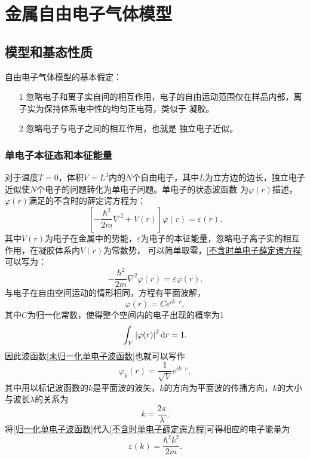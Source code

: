 \chapter{金属自由电子气体模型}\label{chapter:金属自由电子气体模型}
\section{模型和基态性质}\label{section:模型和基态性质}
     {自由电子气体模型}的基本假定：
    \begin{itemize}
        \item[1] 忽略电子和离子实自间的相互作用，电子的自由运动范围仅在样品内部，离子实为保持体系电中性的均匀正电荷，类似于 {凝胶}。
        \item[2] 忽略电子与电子之间的相互作用，也就是 {独立电子近似}。
    \end{itemize}
    \subsection{单电子本征态和本征能量}\label{subsection:单电子本征态和本征能量}
        对于温度$T=0$，体积$V=L^3$内的$N$个自由电子，其中$L$为立方边的边长，独立电子近似使$N$个电子的问题转化为单电子问题。单电子的状态波函数
        为$\varphi(r)$描述，$\varphi(r)$满足的不含时的薛定谔方程为：
        \begin{equation}
            \left[-\frac{\hbar^2}{2m}\nabla^2+V(r)\right]\varphi(r)=\varepsilon(r)\label{不含时单电子薛定谔方程}.
        \end{equation}
        其中$V(r)$为电子在金属中的势能，$\varepsilon$为电子的本征能量，忽略电子离子实的相互作用，在凝胶体系内$V(r)$为常数势，
        可以简单取零，\autoref{不含时单电子薛定谔方程}可以写为：
        \begin{equation}
            -\frac{\hbar^2}{2m}\nabla^2\varphi(r)=\varepsilon\varphi(r).
        \end{equation}
        与电子在自由空间运动的情形相同，方程有平面波解，
        \begin{equation}
            \varphi(r)=Ce^{ik\cdot r}\label{未归一化单电子波函数},
        \end{equation}
        其中$C$为归一化常数，使得整个空间内的电子出现的概率为1
        \begin{equation}
            \int_V\left|\varphi(r)\right|^2\mathop{}\!\mathrm{d} r=1.
        \end{equation}
        因此波函数\autoref{未归一化单电子波函数}也就可以写作
        \begin{equation}
            \varphi_k(r)=\frac{1}{\sqrt{V}}e^{ik\cdot r}\label{归一化单电子波函数},
        \end{equation}
        其中用以标记波函数的$k$是平面波的波矢，$k$的方向为平面波的传播方向，$k$的大小与波长$\lambda$的关系为
        \begin{equation}
            k=\frac{2\pi}{\lambda}\label{电子波矢与波长的关系}.
        \end{equation}
        将\autoref{归一化单电子波函数}代入\autoref{不含时单电子薛定谔方程}可得相应的电子能量为
        \begin{equation}
            \varepsilon(k)=\frac{\hbar^2k^2}{2m}\label{单电子近似能量}.
        \end{equation}

